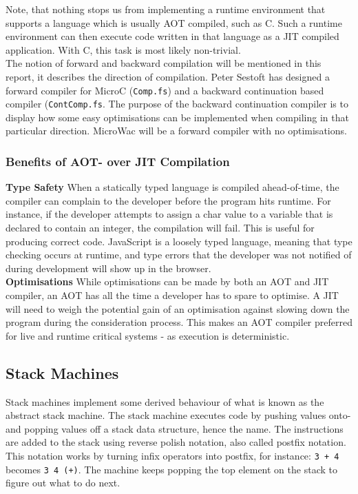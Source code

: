 \documentclass[a4paper]{article}
\begin{document}
Note, that nothing stops us from implementing a runtime environment that supports a language which is usually AOT compiled, such as C. Such a runtime environment can then execute code written in that language as a JIT compiled application. With C, this task is most likely non-trivial.\\

The notion of forward and backward compilation will be mentioned in this report, it describes the direction of compilation. Peter Sestoft has designed a forward compiler for MicroC (\texttt{Comp.fs}) and a backward continuation based compiler (\texttt{ContComp.fs}. The purpose of the backward continuation compiler is to display how some easy optimisations can be implemented when compiling in that particular direction. MicroWac will be a forward compiler with no optimisations.

\subsubsection{Benefits of AOT- over JIT Compilation}
\label{sec:problem-analysis:benefits-of-aot}
\textbf{Type Safety} When a statically typed language is compiled ahead-of-time, the compiler can complain to the developer before the program hits runtime. For instance, if the developer attempts to assign a char value to a variable that is declared to contain an integer, the compilation will fail. This is useful for producing correct code. JavaScript is a loosely typed language, meaning that type checking occurs at runtime, and type errors that the developer was not notified of during development will show up in the browser.\\

\noindent \textbf{Optimisations} While optimisations can be made by both an AOT and JIT compiler, an AOT has all the time a developer has to spare to optimise. A JIT will need to weigh the potential gain of an optimisation against slowing down the program during the consideration process. This makes an AOT compiler preferred for live and runtime critical systems - as execution is deterministic.

\subsection{Stack Machines}
Stack machines implement some derived behaviour of what is known as the abstract stack machine. The stack machine executes code by pushing values onto- and popping values off a stack data structure, hence the name. The instructions are added to the stack using reverse polish notation, also called postfix notation. This notation works by turning infix operators into postfix, for instance: \texttt{3 + 4} becomes \texttt{3 4 (+)}. The machine keeps popping the top element on the stack to figure out what to do next.
\end{document}
